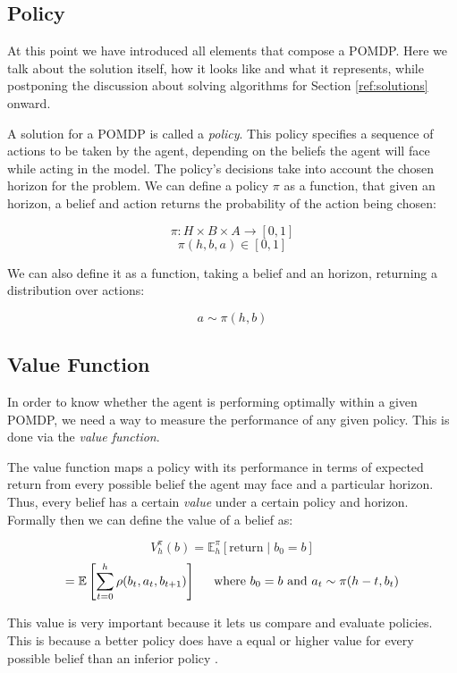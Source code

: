 \subsection{Policy}

At this point we have introduced all elements that compose a POMDP. Here we talk about the solution
itself, how it looks like and what it represents, while postponing the discussion about solving
algorithms for Section \ref{ref:solutions} onward.

A solution for a POMDP is called a \textit{policy}. This policy specifies a sequence of actions to
be taken by the agent, depending on the beliefs the agent will face while acting in the model. The
policy's decisions take into account the chosen horizon for the problem. We can define a policy
$\pi$ as a function, that given an horizon, a belief and action returns the probability of the action
being chosen:

\[ \pi : H \times B \times A \rightarrow [0,1] \]
\[ \pi(h, b, a) \in [0,1] \]

We can also define it as a function, taking a belief and an horizon, returning a distribution over
actions:

\[ a \sim \pi(h, b) \]

\subsection{Value Function}

In order to know whether the agent is performing optimally within a given POMDP, we need a way to measure
the performance of any given policy. This is done via the \textit{value function}.

The value function maps a policy with its performance in terms of expected return from every
possible belief the agent may face and a particular horizon. Thus, every belief has a certain
\textit{value} under a certain policy and horizon. Formally then we can define the value of a belief
as:

\[ V^\pi_{h}(b) = \mathbb{E}^\pi_h \left [\text{return} \mid b_0 = b \right ] \]
\[ = \mathbb{E} \left [\sum_{t=0}^{h} \rho(b_{t}, a_t, b_{t+1}) \right ]
    \hspace{0.5cm}\text{where }b_0 = b \text{ and }a_t \sim \pi(h-t, b_t) \]

This value is very important because it lets us compare and evaluate policies. This is because a
better policy does have a equal or higher value for every possible belief than an inferior policy
\cite{cit:suttonbarto}.

